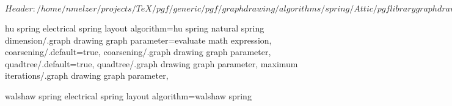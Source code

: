 %
%
%

\ProvidesFileRCS[v\pgfversion] $Header: /home/nmelzer/projects/TeX/pgf/generic/pgf/graphdrawing/algorithms/spring/Attic/pgflibrarygraphdrawing.spring.code.tex,v 1.3 2011/05/09 11:58:05 tantau Exp $





%
% 







%
%



%
% 
%
\pgfgddeclarealgorithmkey
  {hu spring electrical}
  {spring layout}
  {algorithm=hu spring}
  {
    natural spring dimension/.graph drawing graph parameter=evaluate math expression,
    coarsening/.default=true,
    coarsening/.graph drawing graph parameter,
    quadtree/.default=true,
    quadtree/.graph drawing graph parameter,
    maximum iterations/.graph drawing graph parameter,
  }



%
%
%
\pgfgddeclarealgorithmkey
  {walshaw spring electrical}
  {spring layout}
  {algorithm=walshaw spring}
  {}
